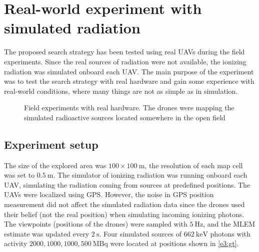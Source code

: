 \section{Real-world experiment with simulated radiation\label{chap:exp3}}
The proposed search strategy has been tested using real \ac{UAV}s during the field experiments.
Since the real sources of radiation were not available, the ionizing radiation was simulated onboard each \ac{UAV}.
The main purpose of the experiment was to test the search strategy with real hardware and gain some experience with real-world conditions, where many things are not as simple as in simulation.
\begin{figure}[!htb]
  \centering
  \caption{Field experiments with real hardware. The drones \protect{} were mapping the simulated radioactive sources located somewhere in the open field \protect{}}
  \label{fig:}
\end{figure}
\subsection{Experiment setup}
The size of the explored area was $100 \times 100\ \si{\meter}$, the resolution of each map cell was set to $\SI{0.5}{\meter}$.
The simulator of ionizing radiation was running onboard each \ac{UAV}, simulating the radiation coming from sources at predefined positions.
The \ac{UAV}s were localized using \ac{GPS}.
However, the noise in \ac{GPS} position measurement did not affect the simulated radiation data since the drones used their belief (not the real position) when simulating incoming ionizing photons.
The viewpoints (positions of the drones) were sampled with $\SI{5}{\hertz}$, and the \ac{MLEM} estimate was updated every $\SI{2}{\second}$.
Four simulated sources of $\SI{662}{\kilo\electronvolt}$ photons with activity $2000, 1000, 1000, 500\ \si{\mega\becquerel}$ were located at positions shown in  \autoref{e3:gt}.


